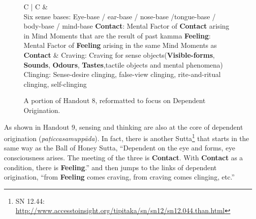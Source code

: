 \begin{figure}[H]
\begin{tabular*}{\textwidth}{C{\tabcolsep} | C{\tabcolsep}}
\toprule
{} &  \\
\midrule
Six sense bases:\newline
 Eye-base / ear-base / nose-base /\newline tongue-base / body-base / mind-base\newline\vspace{5mm}
 \textbf{Contact}:\newline
 Mental Factor of \textbf{Contact} arising in Mind Moments that are the result of past kamma\newline\vspace{5mm}
 \textbf{Feeling}:\newline
 Mental Factor of \textbf{Feeling} arising in the same Mind Moments as \textbf{Contact}
 &
 Craving:\newline
 Craving for sense objects\newline (\textbf{Visible-forms}, \textbf{Sounds}, \textbf{Odours}, \textbf{Tastes},\newline tactile objects and mental phenomena)
 \newline\vspace{5mm}
 Clinging:\newline
 Sense-desire clinging, false-view clinging, rite-and-ritual clinging, self-clinging
 \\
 
\bottomrule
\end{tabular*}
\caption{A portion of Handout 8, reformatted to focus on Dependent Origination.}
\end{figure}

As shown in Handout 9, sensing and thinking are also at the core of dependent origination (\textit{paṭiccasamuppāda}). In fact, there is another Sutta\footnote{SN 12.44: \url{http://www.accesstoinsight.org/tipitaka/sn/sn12/sn12.044.than.html}} that starts in the same way as the Ball of Honey Sutta, “Dependent on the eye and forms, eye consciousness arises. The meeting of the three is \textbf{Contact}. With \textbf{Contact} as a condition, there is \textbf{Feeling}.” and then jumps to the links of dependent origination, “from \textbf{Feeling} comes craving, from craving comes clinging, etc.”

